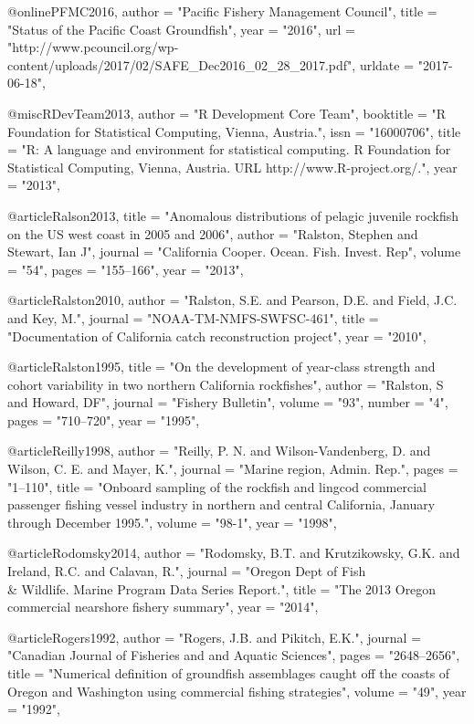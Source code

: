 @online{PFMC2016,
    author = "{Pacific Fishery Management Council}",
    title = "{{Status of the Pacific Coast Groundfish\nFishery}}",
    year = "2016",
    url = "{http://www.pcouncil.org/wp-content/uploads/2017/02/SAFE_Dec2016_02_28_2017.pdf}",
    urldate = "{2017-06-18}",
}

@misc{RDevTeam2013, 
    author = "{{R Development Core Team}}",
    booktitle = "{R Foundation for Statistical Computing, Vienna, Austria.}",
    issn = "{16000706}",
    title = "{{R: A language and environment for statistical computing. R Foundation for Statistical Computing, Vienna, Austria. URL http://www.R-project.org/.}}",
    year = "{2013}",
}

@article{Ralson2013,
    title = "{Anomalous distributions of pelagic juvenile rockfish on the US west coast in 2005 and 2006}",
    author = "{Ralston, Stephen and Stewart, Ian J}",
    journal = "{California Cooper. Ocean. Fish. Invest. Rep}",
    volume = "{54}",
    pages = "{155--166}",
    year = "{2013}",
}

@article{Ralston2010,
    author = "{Ralston, S.E. and Pearson, D.E. and Field, J.C. and Key, M.}",
    journal = "{NOAA-TM-NMFS-SWFSC-461}",
    title = "{{Documentation of California catch reconstruction project}}",
    year = "{2010}",
}

@article{Ralston1995,
    title = "{On the development of year-class strength and cohort variability in two northern California rockfishes}",
    author = "{Ralston, S and Howard, DF}",
    journal = "{Fishery Bulletin}",
    volume = "{93}",
    number = "{4}",
    pages = "{710--720}",
    year = "{1995}",
}

@article{Reilly1998,
    author = "{Reilly, P. N. and Wilson-Vandenberg, D. and Wilson, C. E. and Mayer, K.}",
    journal = "{Marine region, Admin. Rep.}",
    pages = "{1--110}",
    title = "{{Onboard sampling of the rockfish and lingcod commercial passenger fishing vessel industry in northern and central California, January through December 1995.}}",
    volume = "{98-1}",
    year = "{1998}",
}

@article{Rodomsky2014,
    author = "{Rodomsky, B.T. and Krutzikowsky, G.K. and Ireland, R.C. and Calavan, R.}",
    journal = "{Oregon Dept of Fish \\& Wildlife. Marine Program Data Series Report.}",
    title = "{{The 2013 Oregon commercial nearshore fishery summary}}",
    year = "{2014}",
}

@article{Rogers1992,
    author = "{Rogers, J.B. and Pikitch, E.K.}",
    journal = "{Canadian Journal of Fisheries and and Aquatic Sciences}",
    pages = "{2648--2656}",
    title = "{{Numerical definition of groundfish assemblages caught off the coasts of Oregon and Washington using commercial fishing strategies}}",
    volume = "{49}",
    year = "{1992}",
}


